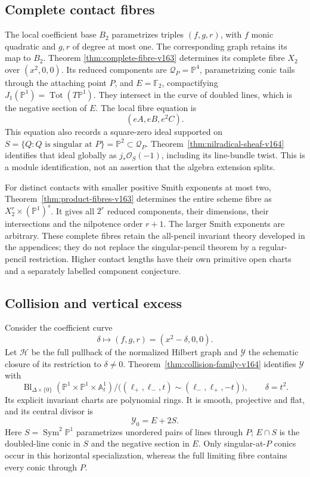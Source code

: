 \documentclass[11pt,reqno]{amsart}
\numberwithin{equation}{section}
\theoremstyle{definition}\newtheorem{definition}[theorem]{Definition}
\theoremstyle{remark}\newtheorem{remark}[theorem]{Remark}
\newcommand{\Pj}{\mathbb P}\newcommand{\A}{\mathbb A}
\newcommand{\OO}{\mathcal O}\newcommand{\II}{\mathcal I}
\begin{document}
\subsection{Complete contact fibres}
The local coefficient base $B_2$ parametrizes triples $(f,g,r)$,
with $f$ monic quadratic and $g,r$ of degree at most one. The
corresponding graph retains its map to $B_2$. Theorem
\ref{thm:complete-fibre-v163} determines its complete fibre $X_2$
over $(x^2,0,0)$. Its reduced components are
$\mathcal Q_P=\Pj^4$, parametrizing conic tails through the
attaching point $P$, and $E=\mathbb F_2$, compactifying
$J_1(\Pj^1)=\operatorname{Tot}(T\Pj^1)$. They intersect in the
curve of doubled lines, which is the negative section of $E$.
The local fibre equation is
\[
                  (eA,eB,e^2C).
\]
This equation also records a square-zero ideal supported on
$S=\{Q:Q\text{ is singular at }P\}=\Pj^2\subset\mathcal Q_P$.
Theorem~\ref{thm:nilradical-sheaf-v164} identifies that ideal globally
as $j_*\OO_S(-1)$, including its line-bundle twist. This is a module
identification, not an assertion that the algebra extension splits.

For distinct contacts with smaller positive Smith exponents at most
two, Theorem~\ref{thm:product-fibres-v163} determines the entire
scheme fibre as $X_2^r\times(\Pj^1)^s$. It gives all $2^r$ reduced
components, their dimensions, their intersections and the nilpotence
order $r+1$. The larger Smith exponents are arbitrary. These complete
fibres retain the all-pencil invariant theory developed in the
appendices; they do not replace the singular-pencil theorem by a
regular-pencil restriction. Higher contact lengths have their own
primitive open charts and a separately labelled component conjecture.

\subsection{Collision and vertical excess}
Consider the coefficient curve
\[
 \delta\longmapsto(f,g,r)=(x^2-\delta,0,0).
\]
Let $\mathcal H$ be the full pullback of the normalized Hilbert graph
and $\mathcal Y$ the schematic closure of its restriction to
$\delta\ne0$. Theorem~\ref{thm:collision-family-v164} identifies
$\mathcal Y$ with
\[
 \operatorname{Bl}_{\Delta\times\{0\}}
   (\Pj^1\times\Pj^1\times\mathbb A^1_t)
       /\bigl((\ell_+,\ell_-,t)\sim(\ell_-,\ell_+,-t)\bigr),
 \qquad \delta=t^2.
\]
Its explicit invariant charts are polynomial rings. It is smooth,
projective and flat, and its central divisor is
\[
                            \mathcal Y_0=E+2S.
\]
Here $S=\operatorname{Sym}^2\Pj^1$ parametrizes unordered pairs of
lines through $P$; $E\cap S$ is the doubled-line conic in $S$ and
the negative section in $E$. Only singular-at-$P$ conics occur in
this horizontal specialization, whereas the full limiting fibre
contains every conic through $P$.
\end{document}

